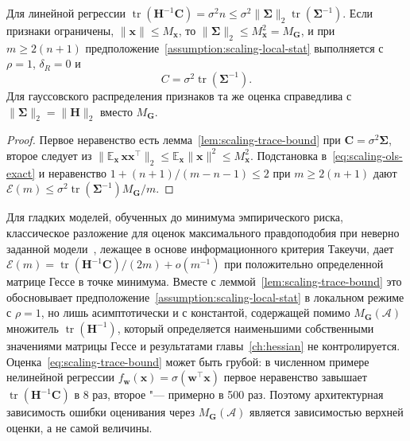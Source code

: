 \begin{corollary}
    \label{cor:scaling-ols-assumption}
    Для линейной регрессии $\operatorname{tr}(\mathbf H^{-1}\mathbf C) = \sigma^2 n \leqslant \sigma^2 \|\boldsymbol\Sigma\|_2 \operatorname{tr}(\boldsymbol\Sigma^{-1})$. Если признаки ограничены, $\|\mathbf x\| \leqslant M_{\mathbf x}$, то $\|\boldsymbol\Sigma\|_2 \leqslant M_{\mathbf x}^2 = M_{\mathbf G}$, и при $m \geqslant 2(n+1)$ предположение~\ref{assumption:scaling-local-stat} выполняется с $\rho = 1$, $\delta_R = 0$ и
    \[
        C = \sigma^2 \operatorname{tr}(\boldsymbol\Sigma^{-1}).
    \]
    Для гауссовского распределения признаков та же оценка справедлива с $\|\boldsymbol\Sigma\|_2 = \|\mathbf H\|_2$ вместо $M_{\mathbf G}$.
\end{corollary}

\begin{proof}
    Первое неравенство есть лемма~\ref{lem:scaling-trace-bound} при $\mathbf C = \sigma^2\boldsymbol\Sigma$, второе следует из $\|\mathbb E_{\mathbf x}\,\mathbf x\mathbf x^\top\|_2 \leqslant \mathbb E_{\mathbf x}\|\mathbf x\|^2 \leqslant M_{\mathbf x}^2$. Подстановка в~\eqref{eq:scaling-ols-exact} и неравенство $1 + (n+1)/(m-n-1) \leqslant 2$ при $m \geqslant 2(n+1)$ дают $\mathcal E(m) \leqslant \sigma^2 \operatorname{tr}(\boldsymbol\Sigma^{-1}) M_{\mathbf G} / m$.
\end{proof}

\begin{remark}
    Для гладких моделей, обученных до минимума эмпирического риска, классическое разложение для оценок максимального правдоподобия при неверно заданной модели~\cite{white1982misspecified}, лежащее в основе информационного критерия Такеучи, дает $\mathcal E(m) = \operatorname{tr}(\mathbf H^{-1}\mathbf C)/(2m) + o(m^{-1})$ при положительно определенной матрице Гессе в точке минимума. Вместе с леммой~\ref{lem:scaling-trace-bound} это обосновывает предположение~\ref{assumption:scaling-local-stat} в локальном режиме с $\rho = 1$, но лишь асимптотически и с константой, содержащей помимо $M_{\mathbf G}(\mathcal A)$ множитель $\operatorname{tr}(\mathbf H^{-1})$, который определяется наименьшими собственными значениями матрицы Гессе и результатами главы~\ref{ch:hessian} не контролируется. Оценка~\eqref{eq:scaling-trace-bound} может быть грубой: в численном примере нелинейной регрессии $f_{\mathbf w}(\mathbf x) = \sigma(\mathbf w^\top\mathbf x)$ первое неравенство завышает $\operatorname{tr}(\mathbf H^{-1}\mathbf C)$ в 8 раз, второе "--- примерно в 500 раз. Поэтому архитектурная зависимость ошибки оценивания через $M_{\mathbf G}(\mathcal A)$ является зависимостью верхней оценки, а не самой величины.
\end{remark}

